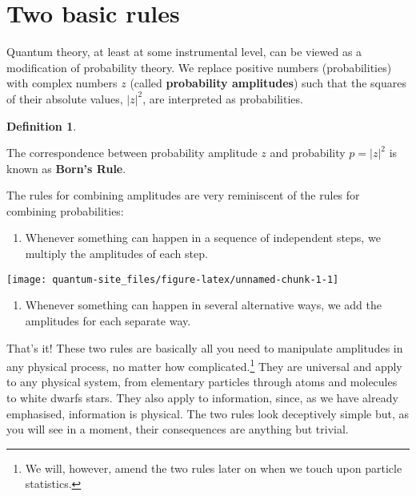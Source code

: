 \documentclass[
]{book}
\providecommand{\tightlist}{%
  \setlength{\itemsep}{0pt}\setlength{\parskip}{0pt}}
\theoremstyle{definition}
\newtheorem{definition}{Definition}[chapter]
\theoremstyle{definition}
\theoremstyle{definition}
\theoremstyle{remark}
\begin{document}
\hypertarget{two-basic-rules}{%
\section{Two basic rules}\label{two-basic-rules}}

Quantum theory, at least at some instrumental level, can be viewed as a modification of probability theory.
We replace positive numbers (probabilities) with complex numbers \(z\) (called \textbf{probability amplitudes}) such that the squares of their absolute values, \(|z|^2\), are interpreted as probabilities.

\begin{definition}
\protect\hypertarget{def:unlabeled-div-1}{}\label{def:unlabeled-div-1}

The correspondence between probability amplitude \(z\) and probability \(p=|z|^2\) is known as \textbf{Born's Rule}.

\end{definition}

The rules for combining amplitudes are very reminiscent of the rules for combining probabilities:

\begin{enumerate}
\def\labelenumi{\arabic{enumi}.}
\tightlist
\item
  Whenever something can happen in a sequence of independent steps, we multiply the amplitudes of each step.
\end{enumerate}

\begin{center}\texttt{[image: quantum-site\_files/figure-latex/unnamed-chunk-1-1]} \end{center}

\begin{enumerate}
\def\labelenumi{\arabic{enumi}.}
\setcounter{enumi}{1}
\tightlist
\item
  Whenever something can happen in several alternative ways, we add the amplitudes for each separate way.
\end{enumerate}

That's it!
These two rules are basically all you need to manipulate amplitudes in any physical process, no matter how complicated.\footnote{We will, however, amend the two rules later on when we touch upon particle statistics.}
They are universal and apply to any physical system, from elementary particles through atoms and molecules to white dwarfs stars.
They also apply to information, since, as we have already emphasised, information is physical.
The two rules look deceptively simple but, as you will see in a moment, their consequences are anything but trivial.
\end{document}

